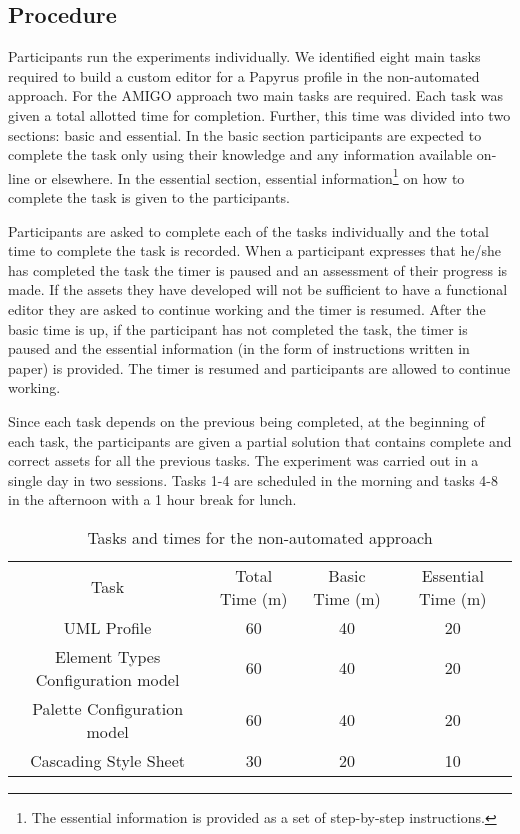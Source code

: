 \subsection{Procedure}
Participants run the experiments individually.
We identified eight main tasks required to build a custom editor for a Papyrus profile in the non-automated approach.
For the AMIGO approach two main tasks are required.
Each task was given a total allotted time for completion. Further, this time was divided into two sections: basic and essential.
In the basic section participants are expected to complete the task only using their knowledge and any information available on-line or elsewhere.
In the essential section, essential information\footnote{The essential information is provided as a set of step-by-step instructions.} on how to complete the task is given to the participants.

Participants are asked to complete each of the tasks individually and the total time to complete the task is recorded.
When a participant expresses that he/she has completed the task the timer is paused and an assessment of their progress is made.
If the assets they have developed will not be sufficient to have a functional editor they are asked to continue working and the timer is resumed.
After the basic time is up, if the participant has not completed the task, the timer is paused and the essential information (in the form of instructions written in paper)
is provided.
The timer is resumed and participants are allowed to continue working.

Since each task depends on the previous being completed, at the beginning of each task, the participants are given a partial solution that contains complete and correct assets for all the previous tasks.
The experiment was carried out in a single day in two sessions.
Tasks 1-4 are scheduled in the morning and tasks 4-8 in the afternoon with a 1 hour break for lunch.

\begin{table}
    \caption{Tasks and times for the non-automated approach}
    \centering
    \setlength{\tabcolsep}{3.5pt} 
    \begin{tabular}{|c|c|c|c|}
        Task & Total Time (m) & Basic Time (m) & Essential Time (m) \\ 
        UML Profile & 60 & 40 & 20 \\
        Element Types Configuration model & 60 & 40 & 20 \\
        Palette Configuration model & 60 & 40 & 20 \\
        Cascading Style Sheet & 30 & 20 & 10 \\
    \end{tabular}
\end{table}

